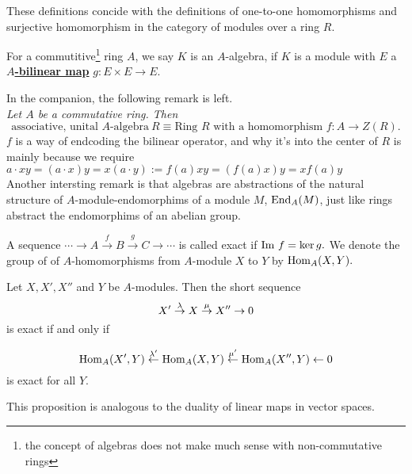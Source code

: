     These definitions concide with the definitions of one-to-one homomorphisms and surjective homomorphism in the category of modules over a ring $R$.

    \begin{definition}
        For a commutitive\footnote{the concept of algebras does not make much sense with non-commutative rings} ring $A$, we say $K$ is an $A$-algebra, if $K$ is a module with $E$ a \textbf{\href{https://en.wikipedia.org/wiki/Bilinear_map}{$A$-bilinear map}} $g:E \times E \to E.$ 
    \end{definition}

    \horline

    \noindent In the companion, the following remark is left.\\

    \textit{Let $A$ be a commutative ring. Then 
        $$\text{associative, unital }A\text{-algebra}\ R \equiv \text{Ring $R$ with a homomorphism $f:A \to Z(R).$}$$
    }
    \noindent $f$ is a way of endcoding the bilinear operator, and why it's into the center of $R$ is mainly because we require $a\cdot xy = (a\cdot x)y = x(a \cdot y) :=  f(a)xy = (f(a)x)y = xf(a)y $\\

    Another intersting remark is that algebras are abstractions of the natural structure of $A$-module-endomorphims of a module $M$, $\text{End}_A(M)$, just like rings abstract the endomorphims of an abelian group.  \\
    \horline

    A sequence $\cdots \to A \overset{f}\to B \overset{g}\to C \to \cdots $ is called exact if $\mathrm{Im}\  f  = \ker g.$ We denote the group of of $A$-homomorphisms from $A$-module $X$ to $Y$ by $\mathrm{Hom}_A(X, Y).$
    \begin{proposition}
        Let $X, X', X''$ and $Y$ be $A$-modules. Then the short sequence
        $$X' \overset{\lambda}{\to} X \overset{\mu}{\to} X'' \to 0$$
        is exact if and only if 

        $$ \mathrm{Hom}_A(X', Y) \overset{\lambda'}{\leftarrow} \mathrm{Hom}_A(X, Y) \overset{\mu'}{\leftarrow} \mathrm{Hom}_A(X'', Y) \leftarrow 0$$
        is exact for all $Y$.
    \end{proposition}
    \begin{remark}
        This proposition is analogous to the duality of linear maps in vector spaces. 
    \end{remark}

